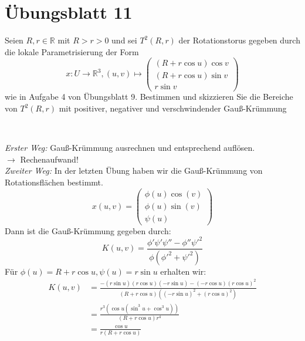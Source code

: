 \section{Übungsblatt 11}
\setcounter{problemcounter}{0}

\begin{assignment}
  Seien \( R, r \in \mathbb{R} \) mit \( R > r > 0 \) und sei \( T^2(R,r) \) der Rotationstorus gegeben durch die lokale Parametrisierung der Form
  \begin{equation*}
    x: U \to \mathbb{R}^3, (u,v) \mapsto \begin{pmatrix}
      (R + r\cos u) \cos v \\
      (R + r\cos u) \sin v \\
      r \sin v
    \end{pmatrix}
  \end{equation*}
  wie in Aufgabe 4 von Übungsblatt 9. Bestimmen und skizzieren Sie die Bereiche von \( T^2(R,r) \) mit positiver, negativer und verschwindender Gauß-Krümmung 
\end{assignment}
\begin{solution}
  \
\end{solution}
\emph{Erster Weg:} Gauß-Krümmung ausrechnen und entsprechend auflösen. \\
\( \rightarrow \) Rechenaufwand! \\
\emph{Zweiter Weg:} In der letzten Übung haben wir die Gauß-Krümmung von Rotationsflächen bestimmt.
\begin{equation*}
  x(u,v) = \begin{pmatrix}
    \phi(u) \cos(v) \\
    \phi(u) \sin(v) \\
    \psi(u) 
  \end{pmatrix}
\end{equation*}
Dann ist die Gauß-Krümmung gegeben durch: 
\begin{equation*} 
  K(u,v) = \frac{\phi' \psi' \psi'' - \phi'' \psi'^2}{\phi(\phi'^2 + \psi'^2)}
\end{equation*}
Für \( \phi(u) = R + r \cos u, \psi(u) = r \sin u \) erhalten wir:
\begin{align*}
  K(u,v) &= \frac{-(r \sin u)(r \cos u)(-r \sin u)-(-r \cos u){(r \cos u)}^2}{(R+r \cos u)({(-r \sin u)}^2 + {(r \cos u)}^2)} \\
  &= \frac{r^3(\cos u(\sin^3u + \cos^3 u))}{ (R + r \cos u) r^4} \\
  &= \frac{\cos u}{r(R+r \cos u)} 
\end{align*}
